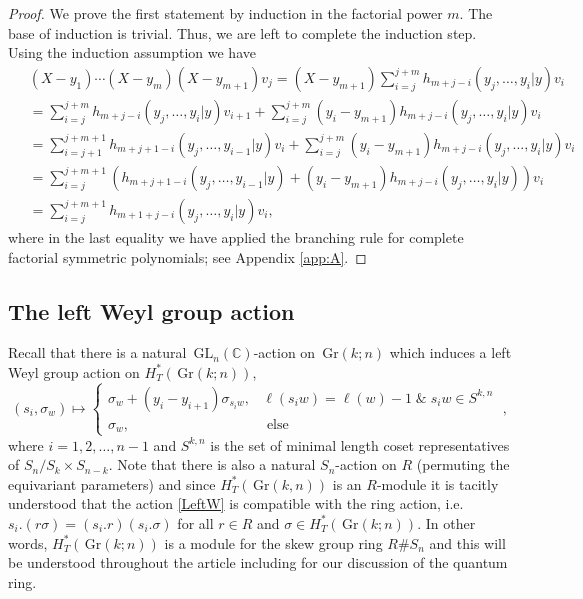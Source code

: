 \documentclass[12pt]{amsart}
\newcommand{\C}{\mathbb{C}}
\newcommand{\GL}{\,\mathrm{GL}}
\newcommand{\Gr}{\,\mathrm{Gr}}
\newcommand{\ring}{R}
\numberwithin{equation}{section}
\numberwithin{figure}{section}
\begin{document}
\begin{proof}
We prove the first statement by induction in the factorial power $m$. The base of induction is trivial. Thus, we are left to complete the induction step. Using the induction assumption we have
\begin{align*}
    \;& (X-y_1) \cdots (X-y_m)(X-y_{m+1})v_j = (X-y_{m + 1})\sum\limits_{i = j}^{j + m}h_{m + j - i}(y_j, \ldots, y_i|y) v_i \\
    \;&= \sum\limits_{i = j}^{j + m}h_{m + j - i}(y_j, \ldots, y_i|y) v_{i + 1} + \sum\limits_{i = j}^{j + m} (y_i - y_{m + 1}) h_{m + j - i}(y_j, \ldots, y_i|y) v_i \\
    \;&= \sum\limits_{i = j + 1}^{j + m + 1}h_{m + j + 1 - i}(y_j, \ldots, y_{i - 1}|y) v_i + \sum\limits_{i = j}^{j + m} (y_i - y_{m + 1}) h_{m + j - i}(y_j, \ldots, y_i|y) v_i \\
    \;&= \sum\limits_{i = j}^{j+m + 1} (h_{m + j + 1 - i}(y_j, \ldots, y_{i - 1}|y) +(y_i - y_{m + 1}) h_{m + j - i}(y_j, \ldots, y_i|y))v_i \\
    \;&= \sum\limits_{i = j}^{j + m + 1}h_{m+1+j-i}(y_j, \ldots, y_i|y)v_i,
\end{align*}
where in the last equality we have applied the branching rule for complete factorial symmetric polynomials; see Appendix \ref{app:A}.
\end{proof}
\subsection{The left Weyl group action}
Recall that there is a natural $\GL_n(\C)$-action on $\Gr(k;n)$ which induces a left Weyl group action on $H^*_T(\Gr(k;n))$,
\begin{equation}\label{LeftW}
(s_i,\sigma_w)\mapsto\left\{\begin{array}{ll}
\sigma_w+(y_i-y_{i+1})\sigma_{s_iw},& \ell(s_iw)=\ell(w)-1\;\&\;s_i w\in S^{k,n}\\
\sigma_w,&\text{ else}
\end{array}
\right.\;,
\end{equation}
where $i=1,2,\ldots,n-1$ and $S^{k,n}$ is the set of minimal length coset representatives of $S_n/S_k\times S_{n-k}$. Note that there is also a natural $S_n$-action on $\ring$ (permuting the equivariant parameters) and since $H^*_T(\Gr(k,n))$ is an $\ring$-module it is tacitly understood that the action \eqref{LeftW} is compatible with the ring action, i.e. $s_i.(r\sigma)=(s_i.r)(s_i.\sigma)$ for all $r\in\ring$ and $\sigma\in H^*_T(\Gr(k;n))$. In other words, $H^*_T(\Gr(k;n))$ is a module for the skew group ring $\ring\#S_n$ and this will be understood throughout the article including for our discussion of the quantum ring.
\end{document}
